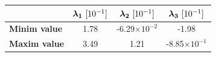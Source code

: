 \documentclass[usenatbib]{latex/mn2e}
\begin{document}
\begin{flushleft}
\begin{figure}
\begin{center}

  \label{fig:percolation_analysis}
  \vspace{0.1 cm}

\end{center}
\end{figure}
\end{flushleft}


\begin{flushleft}
\begin{table}
\begin{center}

  \begin{tabular}{l | c c c} \hline
	& $\boldsymbol{ \lambda_{1} }\ [10^{-1}]$ & $\boldsymbol{ \lambda_{2} }\ [10^{-1}]$  & $\boldsymbol{ \lambda_{3} }\ [10^{-1}]$ \\ \hline
	\textbf{Minim value} & 1.78 & -6.29$\times 10^{-2}$ & -1.98 \\
	\textbf{Maxim value} & 3.49 & 1.21 & -8.85$\times 10^{-1}$ \\ \hline
  \end{tabular}
  
  
  \label{Tab:Lambdas_LG}
  
\end{center}
\end{table}
\end{flushleft}
\end{document}
